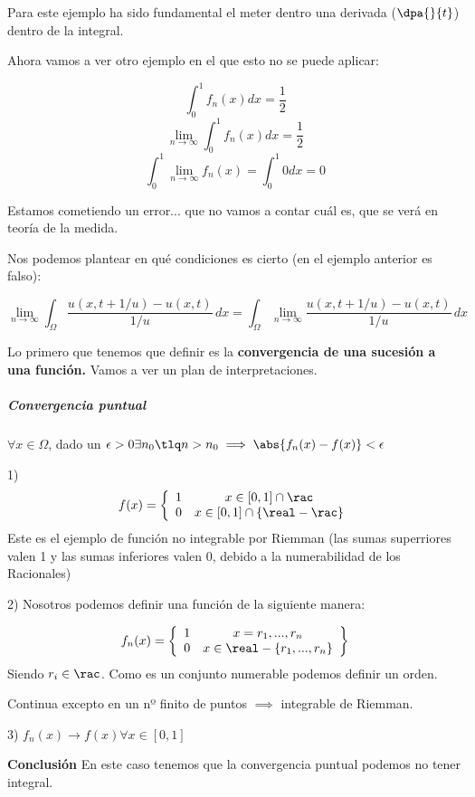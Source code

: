 Para este ejemplo ha sido fundamental el meter dentro una derivada ($\dpa{}{t}$) dentro de la integral.

Ahora vamos a ver otro ejemplo en el que esto no se puede aplicar:

\begin{example}
\[\int_0^1 f_n(x)dx = \frac{1}{2}\]
\[\lim_{n\to\infty}\int_0^1 f_n(x)dx = \frac{1}{2}\]
\[\int_0^1 \lim_{n\to\infty} f_n(x) = \int_0^1 0dx = 0\]

Estamos cometiendo un error... que no vamos a contar cuál es, que se verá en teoría de la medida.
\end{example}

Nos podemos plantear en qué condiciones es cierto (en el ejemplo anterior es falso):

\[\lim_{n\to\infty} \int_{\Omega}\frac{u(x,t+1/u)-u(x,t)}{1/u} \,dx = \int_{\Omega}\lim_{n\to\infty}\frac{u(x,t+1/u)-u(x,t)}{1/u} \,dx
\]

Lo primero que tenemos que definir es la \textbf{convergencia de una sucesión a una función.} Vamos a ver un plan de interpretaciones.

\subparagraph{\textit{Convergencia puntual}}

$\forall x\in\Omega$, dado un $\epsilon>0\\ \exists n_0 \tlq n>n_0 \implies \abs{f_n(x)-f(x)}<\epsilon$

\begin{example}
1) \[f(x) = \left\{\begin{array}{cc}
1 & x\in[0,1]\cap \rac\\
0 & x\in[0,1]\cap\{\real-\rac\}
\end{array}\right.\]
Este es el ejemplo de función no integrable por Riemman (las sumas superriores valen 1 y las sumas inferiores valen 0, debido a la numerabilidad de los Racionales)

2)
Nosotros podemos definir una función de la siguiente manera:

\[f_n(x) = \left\{\begin{array}{cc}
1 & x=r_1,...,r_n\\
0 & x\in\real-\{r_1,...,r_n\}
\end{array}\right\}\]
Siendo $r_i\in\rac$. Como es un conjunto numerable podemos definir un orden.

Continua excepto en un nº finito de puntos $\implies$ integrable de Riemman.

3) $f_n(x)\to f(x) \forall x\in[0,1]$


\textbf{Conclusión} En este caso tenemos que la convergencia puntual podemos no tener integral.
\end{example}

